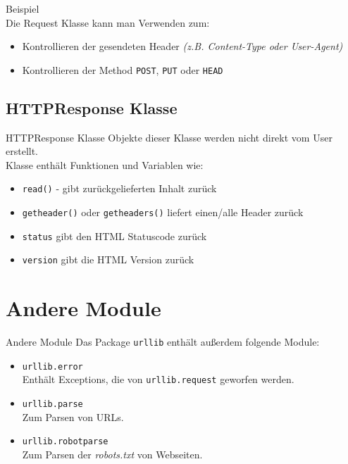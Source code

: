 \begin{frame}{Beispiel}
	 \ \\[.5cm]
	Die Request Klasse kann man Verwenden zum:
	\begin{itemize}
		\item Kontrollieren der gesendeten Header \textit{(z.B. Content-Type oder User-Agent)}
		\item Kontrollieren der Method \texttt{POST}, \texttt{PUT} oder \texttt{HEAD}
	\end{itemize}
\end{frame}

\subsection{HTTPResponse Klasse}
\begin{frame}[fragile]{HTTPResponse Klasse}
	Objekte dieser Klasse werden nicht direkt vom User erstellt.
	 \ \\[.5cm]
	Klasse enth\"alt Funktionen und Variablen wie:
	\begin{itemize}
		\item \texttt{read()} - gibt zur\"uckgelieferten Inhalt zur\"uck
		\item \texttt{getheader()} oder \texttt{getheaders()} liefert einen/alle Header zur\"uck
		\item \texttt{status} gibt den HTML Statuscode zur\"uck
		\item \texttt{version} gibt die HTML Version zur\"uck
	\end{itemize}
\end{frame}


\section{Andere Module}
\begin{frame}[fragile]{Andere Module}
	Das Package \texttt{urllib} enth\"alt au{\ss}erdem folgende Module:
	\begin{itemize}
		\item \texttt{urllib.error} \ \\
			Enth\"alt Exceptions, die von \texttt{urllib.request} geworfen werden.
		\item \texttt{urllib.parse} \ \\
			Zum Parsen von URLs.
		\item \texttt{urllib.robotparse} \ \\
			Zum Parsen der \textit{robots.txt} von Webseiten.
	\end{itemize}
\end{frame}


